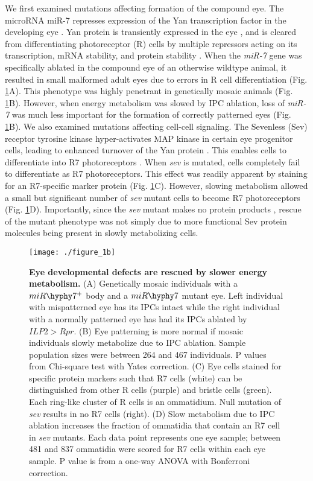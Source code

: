 We first examined mutations affecting formation of the compound eye. The microRNA miR-7 represses expression of the Yan transcription factor in the developing eye \cite{Li2005}. Yan protein is transiently expressed in the eye \cite{Pelaez2015a}, and is cleared from differentiating photoreceptor (R) cells by multiple repressors acting on its transcription, mRNA stability, and protein stability \cite{Graham2010}. When the \textit{miR-7} gene was specifically ablated in the compound eye of an otherwise wildtype animal, it resulted in small malformed adult eyes due to errors in R cell differentiation (Fig. \ref{fig:metabolism:fig1b}A). This phenotype was highly penetrant in genetically mosaic animals (Fig. \ref{fig:metabolism:fig1b}B). However, when energy metabolism was slowed by IPC ablation, loss of \textit{miR-7} was much less important for the formation of correctly patterned eyes (Fig. \ref{fig:metabolism:fig1b}B). We also examined mutations affecting cell-cell signaling. The Sevenless (Sev) receptor tyrosine kinase hyper-activates MAP kinase in certain eye progenitor cells, leading to enhanced turnover of the Yan protein \cite{Rebay1995}. This enables cells to differentiate into R7 photoreceptors \cite{Voas2004}. When \textit{sev} is mutated, cells completely fail to differentiate as R7 photoreceptors. This effect was readily apparent by staining for an R7-specific marker protein (Fig. \ref{fig:metabolism:fig1b}C). However, slowing metabolism allowed a small but significant number of \textit{sev} mutant cells to become R7 photoreceptors (Fig. \ref{fig:metabolism:fig1b}D). Importantly, since the \textit{sev} mutant makes no protein products \cite{Banerjee1987}, rescue of the mutant phenotype was not simply due to more functional Sev protein molecules being present in slowly metabolizing cells.

\begin{figure}[h!]
\centering
\texttt{[image: ./figure\_1b]}
\caption[Eye developmental defects are rescued by slower energy metabolism.]{\textbf{Eye developmental defects are rescued by slower energy metabolism.} (A) Genetically mosaic individuals with a $miR\hyphy 7^+$ body and a $miR\hyphy  7$ mutant eye. Left individual with mispatterned eye has its IPCs intact while the right individual with a normally patterned eye has had its IPCs ablated by $ILP2>Rpr$. (B) Eye patterning is more normal if mosaic individuals slowly metabolize due to IPC ablation. Sample population sizes were between 264 and 467 individuals. P values from Chi-square test with Yates correction. (C) Eye cells stained for specific protein markers such that R7 cells (white) can be distinguished from other R cells (purple) and bristle cells (green). Each ring-like cluster of R cells is an ommatidium. Null mutation of \textit{sev} results in no R7 cells (right). (D) Slow metabolism due to IPC ablation increases the fraction of ommatidia that contain an R7 cell in \textit{sev} mutants. Each data point represents one eye sample; between 481 and 837 ommatidia were scored for R7 cells within each eye sample. P value is from a one-way ANOVA with Bonferroni correction.}
\label{fig:metabolism:fig1b}
\end{figure}


